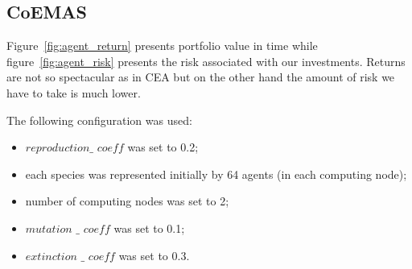 \subsection{CoEMAS}

Figure~\ref{fig:agent_return} presents portfolio value in time while  figure~\ref{fig:agent_risk} presents the risk associated with our investments.
Returns are not so spectacular as in CEA but on the other hand the amount of risk we have to take is much lower.

The following configuration was used:
\begin{itemize}
  \item $reproduction\_$ $coeff$ was set to 0.2;
  \item each species was represented initially by 64 agents (in each computing node);
  \item number of computing nodes was set to 2;
  \item $mutation$ $\_$ $coeff$ was set to 0.1;
  \item $extinction$ $\_$ $coeff$ was set to 0.3.
\end{itemize}

